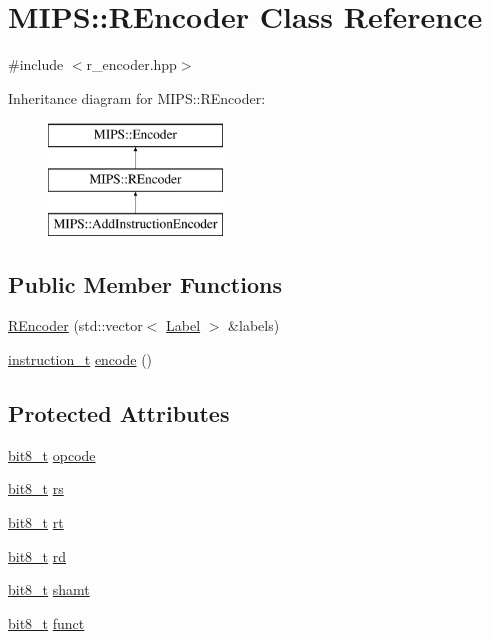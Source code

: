\hypertarget{classMIPS_1_1REncoder}{}\section{M\+I\+PS\+:\+:R\+Encoder Class Reference}
\label{classMIPS_1_1REncoder}


{\ttfamily \#include $<$r\+\_\+encoder.\+hpp$>$}

Inheritance diagram for M\+I\+PS\+:\+:R\+Encoder\+:\begin{figure}[H]
\begin{center}
\leavevmode
\includegraphics[height=3.000000cm]{classMIPS_1_1REncoder}
\end{center}
\end{figure}
\subsection*{Public Member Functions}
\begin{DoxyCompactItemize}
\item 
\hyperlink{classMIPS_1_1REncoder_aecaa80e72064c50b0270f1803e43fa3b}{R\+Encoder} (std\+::vector$<$ \hyperlink{structMIPS_1_1Label}{Label} $>$ \&labels)
\item 
\hyperlink{core_8hpp_aa514fd240a0e29abb2a2e4c805d7f1a4}{instruction\+\_\+t} \hyperlink{classMIPS_1_1REncoder_a2a5a71f7dd73eea571788fbef3d3276a}{encode} ()
\end{DoxyCompactItemize}
\subsection*{Protected Attributes}
\begin{DoxyCompactItemize}
\item 
\hyperlink{core_8hpp_a6074bae122ae7b527864eec42c728c3c}{bit8\+\_\+t} \hyperlink{classMIPS_1_1REncoder_a04c45c6675a84230191ecf390cee278b}{opcode}
\item 
\hyperlink{core_8hpp_a6074bae122ae7b527864eec42c728c3c}{bit8\+\_\+t} \hyperlink{classMIPS_1_1REncoder_a98545a1686a061f09c8ec3cae568df7e}{rs}
\item 
\hyperlink{core_8hpp_a6074bae122ae7b527864eec42c728c3c}{bit8\+\_\+t} \hyperlink{classMIPS_1_1REncoder_a28985816a2e613fe596463094cbd24e6}{rt}
\item 
\hyperlink{core_8hpp_a6074bae122ae7b527864eec42c728c3c}{bit8\+\_\+t} \hyperlink{classMIPS_1_1REncoder_a66d3a5016d3e8ed0dd36750961195e4a}{rd}
\item 
\hyperlink{core_8hpp_a6074bae122ae7b527864eec42c728c3c}{bit8\+\_\+t} \hyperlink{classMIPS_1_1REncoder_a86e13a93659f403b2d251e66d70d7199}{shamt}
\item 
\hyperlink{core_8hpp_a6074bae122ae7b527864eec42c728c3c}{bit8\+\_\+t} \hyperlink{classMIPS_1_1REncoder_aa8301de411b55767a7cca2806584edc1}{funct}
\end{DoxyCompactItemize}
